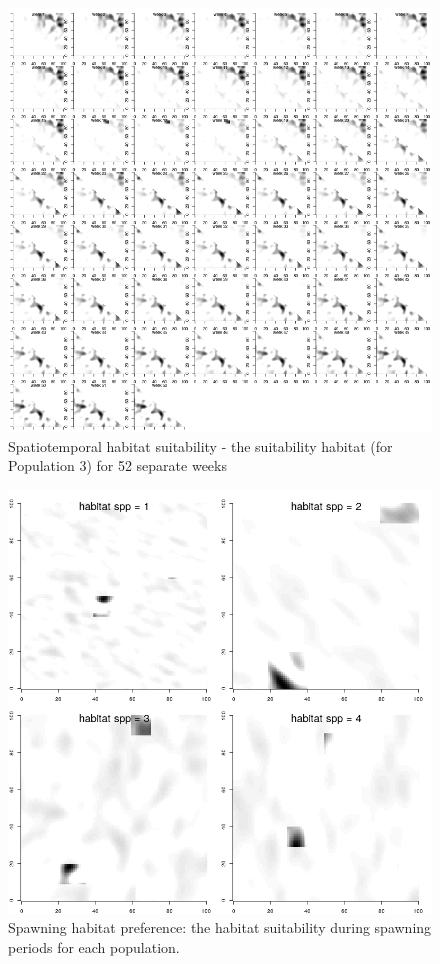 \documentclass[review]{elsarticle}
\begin{document}
\begin{figure}[!ht]
	\includegraphics[width = \linewidth]{Plots/habitat_spatiotemp_spp_3}
	\caption{Spatiotemporal habitat suitability - the suitability habitat
		(for Population 3) for 52 separate weeks}
	\label{fig:7}
\end{figure}

\begin{figure}[!ht]
	\includegraphics[width = \linewidth]{../analysis/habitat_spwn}
	\caption{Spawning habitat preference: the habitat suitability during
		spawning periods for each population.}
	\label{fig:2}
\end{figure}	
\end{document}
